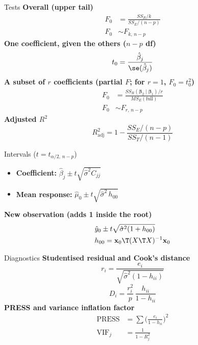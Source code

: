 \begin{formulabox}{Tests}
\textbf{Overall (upper tail)}
\[ \begin{aligned}F_0&=\frac{SS_R/k}{SS_E/(n-p)}\\ F_0&\sim F_{k,\,n-p}\end{aligned} \]
\textbf{One coefficient, given the others ($n-p$ df)}
\[ t_0=\frac{\hat\beta_j}{\se(\hat\beta_j)} \]
\textbf{A subset of $r$ coefficients (partial $F$; for $r=1$, $F_0=t_0^2$)}
\[ \begin{aligned}F_0&=\frac{SS_R(\boldsymbol\beta_2\mid\boldsymbol\beta_1)/r}{MS_E(\text{full})}\\ F_0&\sim F_{r,\,n-p}\end{aligned} \]
\textbf{Adjusted $R^2$}
\[ R^2_{\mathrm{adj}}=1-\frac{SS_E/(n-p)}{SS_T/(n-1)} \]
\end{formulabox}

\begin{formulabox}{Intervals ($t=t_{\alpha/2,\,n-p}$)}
\begin{itemize}
  \item \textbf{Coefficient:} $\hat\beta_j\pm t\sqrt{\hat\sigma^2C_{jj}}$
  \item \textbf{Mean response:} $\hat\mu_0\pm t\sqrt{\hat\sigma^2\,h_{00}}$
\end{itemize}
\textbf{New observation (adds 1 inside the root)}
\[ \begin{aligned}&\hat{y}_0\pm t\sqrt{\hat\sigma^2(1+h_{00})}\\ &h_{00}=\mathbf{x}_0\T(X\T X)^{-1}\mathbf{x}_0\end{aligned} \]
\end{formulabox}

\begin{formulabox}{Diagnostics}
\textbf{Studentised residual and Cook's distance}
\[ r_i=\frac{e_i}{\sqrt{\hat\sigma^2(1-h_{ii})}} \]
\[ D_i=\frac{r_i^2}{p}\,\frac{h_{ii}}{1-h_{ii}} \]
\textbf{PRESS and variance inflation factor}
\[ \begin{aligned}\mathrm{PRESS}&=\sum\Big(\frac{e_i}{1-h_{ii}}\Big)^2\\ \mathrm{VIF}_j&=\frac1{1-R_j^2}\end{aligned} \]
\end{formulabox}

